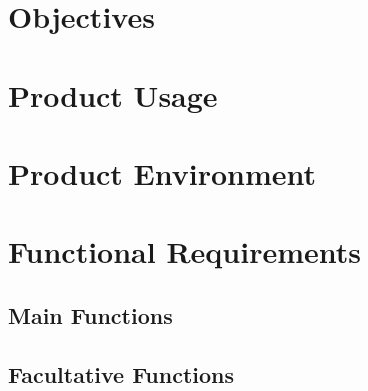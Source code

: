 \documentclass[a4paper, 11pt]{scrartcl}
\begin{document}
%
%
%

\section{Objectives}



\section{Product Usage}


\section{Product Environment}


\section{Functional Requirements}
\subsection{Main Functions}



\subsection{Facultative Functions}


\end{document}
